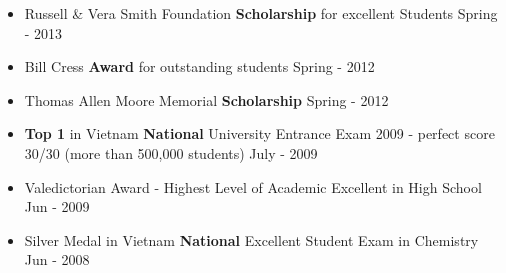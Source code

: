 \begin{itemize}
\itemsep0em 
\item Russell & Vera Smith Foundation \textbf{Scholarship} for excellent Students \hfill Spring - 2013
\item Bill Cress \textbf{Award} for outstanding students \hfill Spring - 2012
\item Thomas Allen Moore Memorial \textbf{Scholarship}  \hfill Spring - 2012
\item \textbf{Top 1} in Vietnam \textbf{National} University Entrance Exam 2009 - perfect score 30/30 (more than 500,000 students) \hfill July - 2009
\item Valedictorian Award - Highest Level of Academic Excellent in High School \hfill Jun - 2009
\item Silver Medal in Vietnam \textbf{National} Excellent Student Exam in Chemistry \hfill Jun - 2008
\end{itemize}










